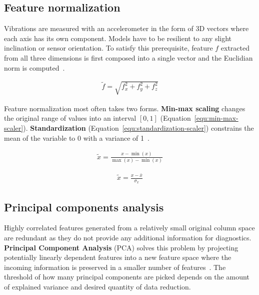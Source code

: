 \subsection{Feature normalization}
Vibrations are measured with an accelerometer in the form of 3D vectors where each axis has its own component. Models have to be resilient to any slight inclination or sensor orientation. To satisfy this prerequisite, feature $f$ extracted from all three dimensions is first composed into a single vector and the Euclidian norm is computed~\cite{kamminga_robust_2018}.

\begin{ceqn}\begin{align}
\widetilde{f} = \sqrt{f_x^2 + f_y^2 + f_z^2}
\end{align}\end{ceqn}

Feature normalization most often takes two forms. \textbf{Min-max scaling} changes the original range of values into an interval $[0, 1]$ (Equation~\ref{equ:min-max-scaler}). \textbf{Standardization} (Equation~\ref{equ:standardization-scaler}) constrains the mean of the variable to 0 with a variance of 1~\cite{zheng_feature_2018}.

\begin{ceqn}\begin{align}
\widetilde{x} = \frac{x - \min(x)}{\max(x) - \min(x)}
\label{equ:min-max-scaler}
\end{align}\end{ceqn}

\begin{ceqn}\begin{align}
\widetilde{x} = \frac{x - \bar{x}}{\sigma_x}
\label{equ:standardization-scaler}
\end{align}\end{ceqn}


\subsection{Principal components analysis}
Highly correlated features generated from a relatively small original column space are redundant as they do not provide any additional information for diagnostics. \textbf{Principal Component Analysis} (PCA) solves this problem by projecting potentially linearly dependent features into a new feature space where the incoming information is preserved in a smaller number of features~\cite{zheng_feature_2018}. The threshold of how many principal components are picked depends on the amount of explained variance and desired quantity of data reduction.

